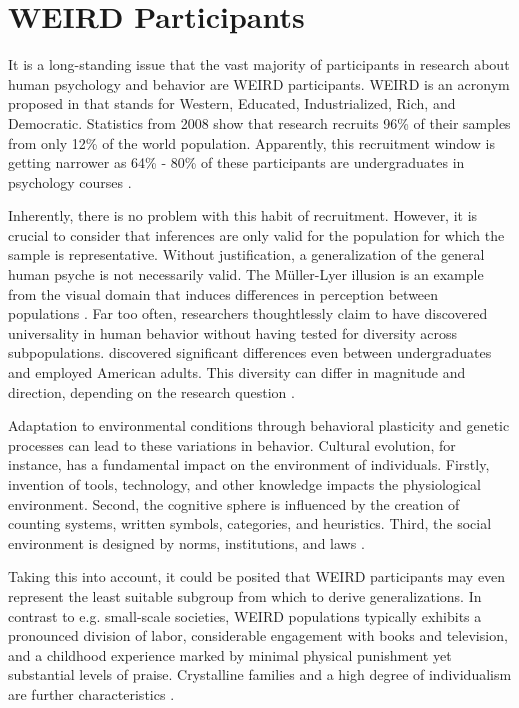 \section{WEIRD Participants}
\label{sec:weired-participants}

It is a long-standing issue that the vast majority of participants in research about human psychology and behavior are WEIRD participants. WEIRD is an acronym proposed in \cite{henrichWeirdest2010} that stands for Western, Educated, Industrialized, Rich, and Democratic. Statistics from 2008 show that research recruits 96\% of their samples from only 12\% of the world population. Apparently, this recruitment window is getting narrower as 64\% - 80\% of these participants are undergraduates in psychology courses \parencite{arnettNeglected2008}.

    Inherently, there is no problem with this habit of recruitment. However, it is crucial to consider that inferences are only valid for the population for which the sample is representative. Without justification, a generalization of the general human psyche is not necessarily valid. The Müller-Lyer illusion is an example from the visual domain that induces differences in perception between populations \parencite{müller-lyer}. Far too often, researchers thoughtlessly claim to have discovered universality in human behavior without having tested for diversity across subpopulations. \textcite{WardUndergradsEmployed1993} discovered significant differences even between undergraduates and employed American adults. This diversity can differ in magnitude and direction, depending on the research question \parencite{henrichWeirdest2010}.

    Adaptation to environmental conditions through behavioral plasticity and genetic processes can lead to these variations in behavior. Cultural evolution, for instance, has a fundamental impact on the environment of individuals. Firstly, invention of tools, technology, and other knowledge impacts the physiological environment. Second, the cognitive sphere is influenced by the creation of counting systems, written symbols, categories, and heuristics. Third, the social environment is designed by norms, institutions, and laws \parencite{henrichWeirdest2010}.

    Taking this into account, it could be posited that WEIRD participants may even represent the least suitable subgroup from which to derive generalizations. In contrast to e.g. small-scale societies, WEIRD populations typically exhibits a pronounced division of labor, considerable engagement with books and television, and a childhood experience marked by minimal physical punishment yet substantial levels of praise. Crystalline families and a high degree of individualism are further characteristics \parencite{henrichWeirdest2010}.


